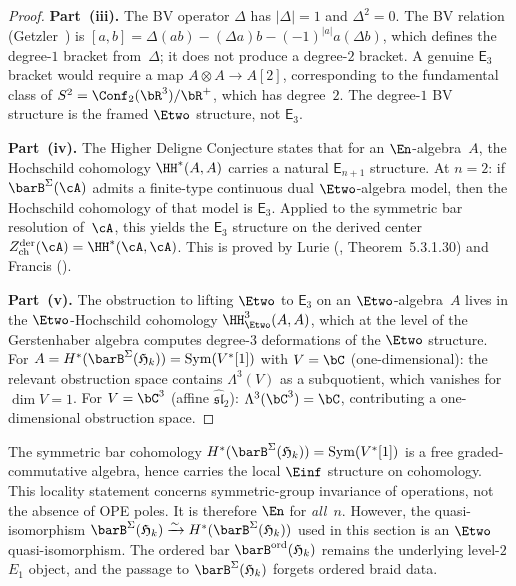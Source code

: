 \begin{proof}
\textbf{Part~(iii).}
The BV operator $\Delta$ has $|\Delta| = 1$ and
$\Delta^2 = 0$. The BV relation (Getzler~\cite{Getzler94}) is
$[a,b] = \Delta(ab) - (\Delta a)b - (-1)^{|a|} a(\Delta b)$,
which defines the degree-$1$ bracket from~$\Delta$; it does not
produce a degree-$2$ bracket. A genuine $\mathsf{E}_3$ bracket
would require a map $A \otimes A \to A[2]$, corresponding to the
fundamental class of $S^2 = \Conf_2(\bR^3)/\bR^+$, which has
degree~$2$. The degree-$1$ BV structure is the framed $\Etwo$
structure, not $\mathsf{E}_3$.

\textbf{Part~(iv).}
The Higher Deligne Conjecture states that for an $\En$-algebra~$A$,
the Hochschild cohomology $\HH^*(A, A)$ carries a natural
$\mathsf{E}_{n+1}$ structure. At $n = 2$: if
$\barB^{\Sigma}(\cA)$ admits a finite-type continuous dual
$\Etwo$-algebra model, then
the Hochschild cohomology of that model is $\mathsf{E}_3$.
Applied to the symmetric bar resolution of~$\cA$, this yields the
$\mathsf{E}_3$ structure on the derived center
$Z^{\mathrm{der}}_{\mathrm{ch}}(\cA) = \HH^*(\cA,\cA)$.
This is proved by Lurie (\cite{HA}, Theorem~5.3.1.30)
and Francis (\cite{Francis2013}).

\textbf{Part~(v).}
The obstruction to lifting $\Etwo$ to $\mathsf{E}_3$ on an
$\Etwo$-algebra~$A$ lives in the $\Etwo$-Hochschild cohomology
$\HH^3_{\Etwo}(A, A)$, which at the level of the Gerstenhaber
algebra computes degree-$3$ deformations of the $\Etwo$ structure.
For $A = H^*(\barB^{\Sigma}(\mathfrak{H}_k))
= \operatorname{Sym}(V^*[1])$
with $V = \bC$ (one-dimensional): the relevant obstruction space
contains $\Lambda^3(V)$ as a subquotient, which vanishes for
$\dim V = 1$. For $V = \bC^3$ (affine $\widehat{\mathfrak{sl}}_2$):
$\Lambda^3(\bC^3) = \bC$, contributing a one-dimensional
obstruction space.
\end{proof}

\begin{remark}
\label{rem:heisenberg-bar-einfty}
The symmetric bar cohomology
$H^*(\barB^{\Sigma}(\mathfrak{H}_k))
= \operatorname{Sym}(V^*[1])$ is a free graded-commutative algebra,
hence carries the local $\Einf$ structure on cohomology. This
locality statement concerns symmetric-group invariance of operations,
not the absence of OPE poles. It is therefore $\En$ for
\emph{all}~$n$.
However, the quasi-isomorphism
$\barB^{\Sigma}(\mathfrak{H}_k)
\xrightarrow{\sim} H^*(\barB^{\Sigma}(\mathfrak{H}_k))$
used in this section is an $\Etwo$ quasi-isomorphism. The ordered
bar $\barB^{\mathrm{ord}}(\mathfrak{H}_k)$ remains the underlying
level-$2$ $E_1$ object, and the passage to
$\barB^{\Sigma}(\mathfrak{H}_k)$ forgets ordered braid data.
\end{remark}

